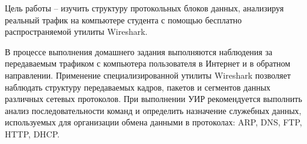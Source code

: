 


\tableofcontents


\newpage
\Chapter{\lab\ \labnumber}{\labtheme}{}


Цель работы – изучить структуру протокольных блоков данных, 
анализируя реальный трафик на компьютере студента с помощью бесплатно 
распространяемой утилиты Wireshark.

В процессе выполнения домашнего задания выполняются наблюдения за 
передаваемым трафиком с компьютера пользователя в Интернет и в обратном 
направлении. Применение специализированной утилиты Wireshark позволяет 
наблюдать структуру передаваемых кадров, пакетов и сегментов данных 
различных сетевых протоколов. При выполнении УИР рекомендуется выполнить 
анализ последовательности команд и определить назначение служебных данных, 
используемых для организации обмена данными в протоколах: ARP, DNS, FTP, 
HTTP, DHCP.

